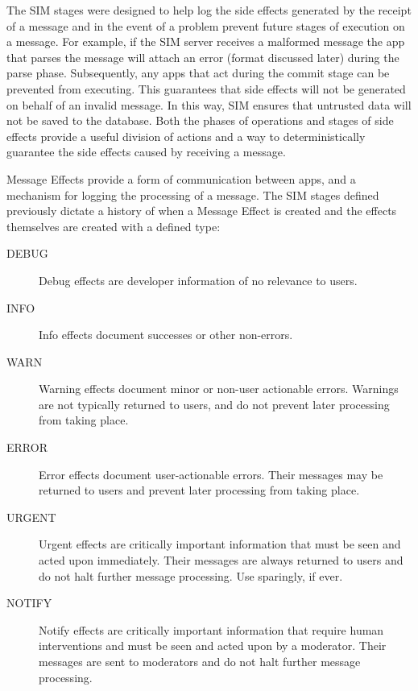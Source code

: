 \documentclass{acm_proc_article-sp}
\begin{document}
The SIM stages were designed to help log the side effects generated by the receipt of a message and in the event of a problem prevent future stages of execution on a message. For example, if the SIM server receives a malformed message the app that parses the message will attach an error (format discussed later) during the parse phase. Subsequently, any apps that act during the commit stage can be prevented from executing. This guarantees that side effects will not be generated on behalf of an invalid message. In this way, SIM ensures that untrusted data will not be saved to the database. Both the phases of operations and stages of side effects provide a useful division of actions and a way to deterministically guarantee the side effects caused by receiving a message.

Message Effects provide a form of communication between apps, and a mechanism for logging the processing of a message. The SIM stages defined previously dictate a history of when a Message Effect is created and the effects themselves are created with a defined type: 

\begin{description}
  \item[DEBUG] Debug effects are developer information of no relevance to users. \\
  \item[INFO] Info effects document successes or other non-errors. \\
  \item[WARN] Warning effects document minor or non-user actionable errors. Warnings are not typically returned to users, and do not prevent later processing from taking place. \\
  \item[ERROR] Error effects document user-actionable errors. Their messages may be returned to users and prevent later processing from taking place. \\
  \item[URGENT] Urgent effects are critically important information that must be seen and acted upon immediately. Their messages are always returned to users and do not halt further message processing. Use sparingly, if ever. \\
  \item[NOTIFY] Notify effects are critically important information that require human interventions and must be seen and acted upon by a moderator. Their messages are sent to moderators and do not halt further message processing. \\
\end{description}
\end{document}
